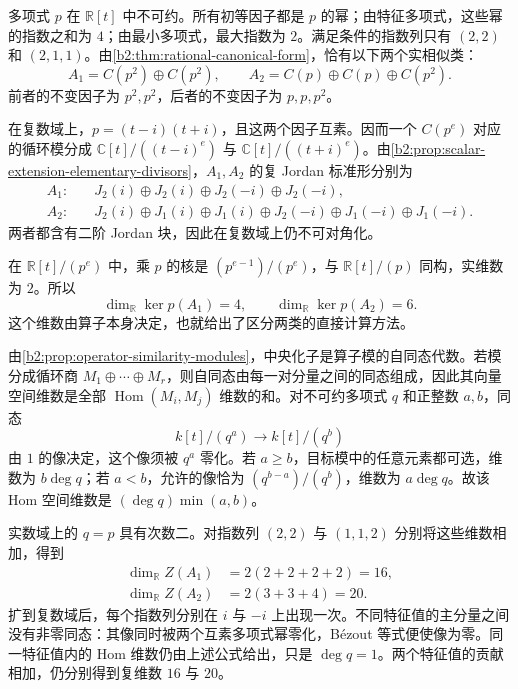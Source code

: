 \begin{solution}
	多项式 \(p\) 在 \(\mathbb R[t]\) 中不可约。所有初等因子都是 \(p\) 的幂；由特征多项式，这些幂的指数之和为 \(4\)；由最小多项式，最大指数为 \(2\)。满足条件的指数列只有 \((2,2)\) 和 \((2,1,1)\)。由\cref{b2:thm:rational-canonical-form}，恰有以下两个实相似类：
	\[
		A_1=C(p^2)\oplus C(p^2),\qquad A_2=C(p)\oplus C(p)\oplus C(p^2).
	\]
	前者的不变因子为 \(p^2,p^2\)，后者的不变因子为 \(p,p,p^2\)。

	在复数域上，\(p=(t-i)(t+i)\)，且这两个因子互素。因而一个 \(C(p^e)\) 对应的循环模分成 \(\mathbb C[t]/((t-i)^e)\) 与 \(\mathbb C[t]/((t+i)^e)\)。由\cref{b2:prop:scalar-extension-elementary-divisors}，\(A_1,A_2\) 的复 Jordan 标准形分别为
	\[
		\begin{aligned}
			A_1:&\quad J_2(i)\oplus J_2(i)\oplus J_2(-i)\oplus J_2(-i),\\
			A_2:&\quad J_2(i)\oplus J_1(i)\oplus J_1(i) \oplus J_2(-i)\oplus J_1(-i)\oplus J_1(-i).
		\end{aligned}
	\]
	两者都含有二阶 Jordan 块，因此在复数域上仍不可对角化。

	在 \(\mathbb R[t]/(p^e)\) 中，乘 \(p\) 的核是 \((p^{e-1})/(p^e)\)，与 \(\mathbb R[t]/(p)\) 同构，实维数为 \(2\)。所以
	\[
		\dim_{\mathbb R}\ker p(A_1)=4,\qquad \dim_{\mathbb R}\ker p(A_2)=6.
	\]
	这个维数由算子本身决定，也就给出了区分两类的直接计算方法。

	由\cref{b2:prop:operator-similarity-modules}，中央化子是算子模的自同态代数。若模分成循环商 \(M_1\oplus\cdots\oplus M_r\)，则自同态由每一对分量之间的同态组成，因此其向量空间维数是全部 \(\operatorname{Hom}(M_i,M_j)\) 维数的和。对不可约多项式 \(q\) 和正整数 \(a,b\)，同态
	\[
		k[t]/(q^a)\longrightarrow k[t]/(q^b)
	\]
	由 \(1\) 的像决定，这个像须被 \(q^a\) 零化。若 \(a\ge b\)，目标模中的任意元素都可选，维数为 \(b\deg q\)；若 \(a<b\)，允许的像恰为 \((q^{b-a})/(q^b)\)，维数为 \(a\deg q\)。故该 Hom 空间维数是 \((\deg q)\min(a,b)\)。

	实数域上的 \(q=p\) 具有次数二。对指数列 \((2,2)\) 与 \((1,1,2)\) 分别将这些维数相加，得到
	\[
		\begin{aligned}
			\dim_{\mathbb R}Z(A_1)&=2(2+2+2+2)=16,\\
			\dim_{\mathbb R}Z(A_2)&=2(3+3+4)=20.
		\end{aligned}
	\]
	扩到复数域后，每个指数列分别在 \(i\) 与 \(-i\) 上出现一次。不同特征值的主分量之间没有非零同态：其像同时被两个互素多项式幂零化，Bézout 等式便使像为零。同一特征值内的 Hom 维数仍由上述公式给出，只是 \(\deg q=1\)。两个特征值的贡献相加，仍分别得到复维数 \(16\) 与 \(20\)。
\end{solution}

